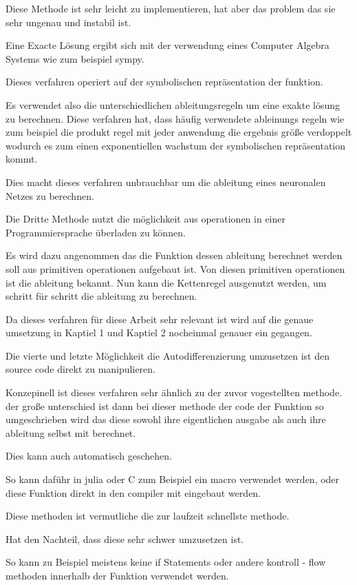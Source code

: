 Diese Methode ist sehr leicht zu implementieren, hat aber das problem das sie sehr ungenau und instabil ist.

Eine Exacte Lösung ergibt sich mit der verwendung eines Computer Algebra Systems wie zum beispiel sympy.

Dieses verfahren operiert auf der symbolischen repräsentation der funktion.

Es verwendet also die unterschiedlichen ableitungsregeln um eine exakte lösung zu berechnen.
Diese verfahren hat, dass häufig verwendete ableinungs regeln wie zum beispiel die produkt regel
mit jeder anwendung die ergebnis größe verdoppelt wodurch es zum einen exponentiellen wachstum 
der symbolischen repräsentation kommt.

Dies macht dieses verfahren unbrauchbar um die ableitung eines neuronalen Netzes zu berechnen.


Die Dritte Methode nutzt die möglichkeit aus operationen 
in einer Programmiersprache überladen zu können.

Es wird dazu angenommen das die Funktion dessen ableitung berechnet werden soll aus primitiven operationen aufgebaut ist.
Von diesen primitiven operationen ist die ableitung bekannt.
Nun kann die Kettenregel ausgenutzt werden, um schritt für schritt die ableitung zu berechnen.

Da dieses verfahren für diese Arbeit sehr relevant ist wird auf die genaue umsetzung in Kaptiel 1 und Kaptiel 2 nocheinmal genauer ein gegangen.

Die vierte und letzte Möglichkeit die Autodifferenzierung umzusetzen ist den source code direkt zu manipulieren.

Konzepinell ist dieses verfahren sehr ähnlich zu der zuvor vogestellten methode. der große unterschied ist dann bei dieser methode der code der Funktion so umgeschrieben wird das diese sowohl ihre eigentlichen ausgabe als auch ihre ableitung selbst mit berechnet.

Dies kann auch automatisch geschehen.

So kann daführ in julia oder C zum Beispiel ein macro verwendet werden, oder diese Funktion direkt in den compiler mit eingebaut werden.

Diese methoden ist vermutliche die zur laufzeit schnellste methode.

Hat den Nachteil, dass diese sehr schwer umzusetzen ist.

So kann zu Beispiel meistens keine if Statements oder andere kontroll - flow methoden innerhalb der Funktion verwendet werden. 

